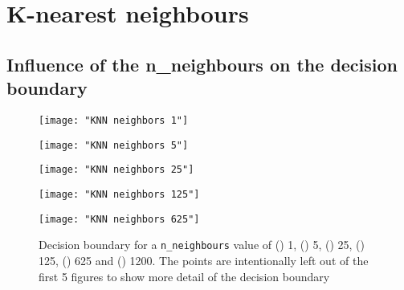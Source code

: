\documentclass[12pt]{article}
\begin{document}
\section{K-nearest neighbours}

\subsection{Influence of the n\_neighbours on the decision boundary}

\begin{figure}[htbp]
\centering
\begin{minipage}{0.3\linewidth}%
  \centering
  \texttt{[image: "KNN neighbors 1"]}%
\label{fig:KNN1a}%
\end{minipage}%
\begin{minipage}{0.3\linewidth}%
  \centering
  \texttt{[image: "KNN neighbors 5"]}%
\label{fig:KNN1b}%
\end{minipage}%
\begin{minipage}{0.3\linewidth}%
  \centering
  \texttt{[image: "KNN neighbors 25"]}%
\label{fig:KNN1c}%
\end{minipage}
\newline
\centering
\begin{minipage}{0.3\linewidth}%
  \centering
  \texttt{[image: "KNN neighbors 125"]}%
\label{fig:KNN1d}%
\end{minipage}%
\begin{minipage}{0.3\linewidth}%
  \centering
  \texttt{[image: "KNN neighbors 625"]}%
\label{fig:KNN1e}%
\end{minipage}%
\begin{minipage}{0.3\linewidth}%
  \centering
\label{fig:KNN1f}%
\end{minipage}%

\caption{ \label{fig:nneighbors} Decision boundary for a \texttt{n\_neighbours} value of () 1, () 5, () 25, () 125, () 625 and () 1200.
The points are intentionally left out of the first 5 figures to show more detail of the decision boundary}
\end{figure}
\end{document}
